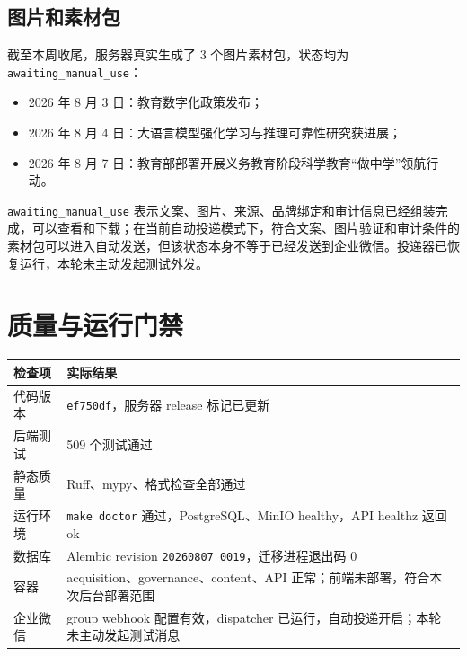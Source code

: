 \documentclass[UTF8,11pt,a4paper,fontset=none]{ctexart}
\begin{document}
\subsection{图片和素材包}

截至本周收尾，服务器真实生成了 3 个图片素材包，状态均为
\texttt{awaiting\_manual\_use}：

\begin{itemize}[leftmargin=2em,itemsep=0.2em]
  \item 2026 年 8 月 3 日：教育数字化政策发布；
  \item 2026 年 8 月 4 日：大语言模型强化学习与推理可靠性研究获进展；
  \item 2026 年 8 月 7 日：教育部部署开展义务教育阶段科学教育“做中学”领航行动。
\end{itemize}

\begin{boundarybox}
\texttt{awaiting\_manual\_use} 表示文案、图片、来源、品牌绑定和审计信息已经组装完成，可以查看和下载；在当前自动投递模式下，符合文案、图片验证和审计条件的素材包可以进入自动发送，但该状态本身不等于已经发送到企业微信。投递器已恢复运行，本轮未主动发起测试外发。
\end{boundarybox}

\section{质量与运行门禁}

\noindent\begin{tabularx}{\textwidth}{L{4.1cm}Y}
\toprule
{}
\color{white}\bfseries\sffamily 检查项 & \color{white}\bfseries\sffamily 实际结果 \\
\midrule
代码版本 & \texttt{ef750df}，服务器 release 标记已更新 \\
后端测试 & 509 个测试通过 \\
静态质量 & Ruff、mypy、格式检查全部通过 \\
运行环境 & \texttt{make doctor} 通过，PostgreSQL、MinIO healthy，API healthz 返回 ok \\
数据库 & Alembic revision \texttt{20260807\_0019}，迁移进程退出码 0 \\
容器 & acquisition、governance、content、API 正常；前端未部署，符合本次后台部署范围 \\
企业微信 & group webhook 配置有效，dispatcher 已运行，自动投递开启；本轮未主动发起测试消息 \\
\bottomrule
\end{tabularx}
\end{document}
